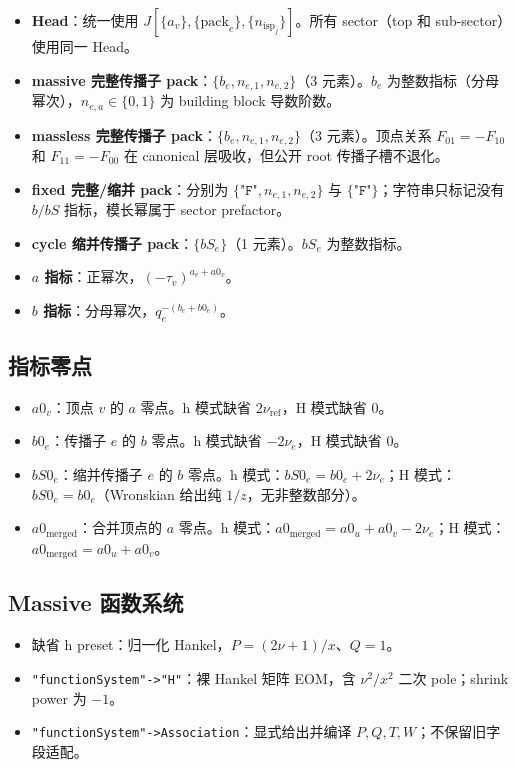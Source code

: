 ﻿\documentclass[a4paper,11pt]{article}
\begin{document}
\begin{itemize}
  \item \textbf{Head}：统一使用 $J[\{a_v\}, \{\text{pack}_e\}, \{n_{\text{isp}_j}\}]$。所有 sector（top 和 sub-sector）使用同一 Head。
  \item \textbf{massive 完整传播子 pack}：$\{b_e, n_{e,1}, n_{e,2}\}$（3 元素）。$b_e$ 为整数指标（分母幂次），$n_{e,a} \in \{0,1\}$ 为 building block 导数阶数。
  \item \textbf{massless 完整传播子 pack}：$\{b_e,n_{e,1},n_{e,2}\}$（3 元素）。顶点关系 $F_{01}=-F_{10}$ 和 $F_{11}=-F_{00}$ 在 canonical 层吸收，但公开 root 传播子槽不退化。
  \item \textbf{fixed 完整/缩并 pack}：分别为 $\{\texttt{"F"},n_{e,1},n_{e,2}\}$ 与 $\{\texttt{"F"}\}$；字符串只标记没有 $b/bS$ 指标，模长幂属于 sector prefactor。
  \item \textbf{cycle 缩并传播子 pack}：$\{bS_e\}$（1 元素）。$bS_e$ 为整数指标。
  \item \textbf{$a$ 指标}：正幂次，$(-\tau_v)^{a_v + a0_v}$。
  \item \textbf{$b$ 指标}：分母幂次，$q_e^{-(b_e + b0_e)}$。
\end{itemize}

\subsection{指标零点}

\begin{itemize}
  \item $a0_v$：顶点 $v$ 的 $a$ 零点。h 模式缺省 $2\nu_{\text{ref}}$，H 模式缺省 $0$。
  \item $b0_e$：传播子 $e$ 的 $b$ 零点。h 模式缺省 $-2\nu_e$，H 模式缺省 $0$。
  \item $bS0_e$：缩并传播子 $e$ 的 $b$ 零点。h 模式：$bS0_e = b0_e + 2\nu_e$；H 模式：$bS0_e = b0_e$（Wronskian 给出纯 $1/z$，无非整数部分）。
  \item $a0_{\text{merged}}$：合并顶点的 $a$ 零点。h 模式：$a0_{\text{merged}} = a0_u + a0_v - 2\nu_e$；H 模式：$a0_{\text{merged}} = a0_u + a0_v$。
\end{itemize}

\subsection{Massive 函数系统}

\begin{itemize}
  \item 缺省 h preset：归一化 Hankel，$P=(2\nu+1)/x$、$Q=1$。
  \item \texttt{"functionSystem"->"H"}：裸 Hankel 矩阵 EOM，含 $\nu^2/x^2$ 二次 pole；shrink power 为 $-1$。
  \item \texttt{"functionSystem"->Association}：显式给出并编译 $P,Q,T,W$；不保留旧字段适配。
\end{itemize}
\end{document}
